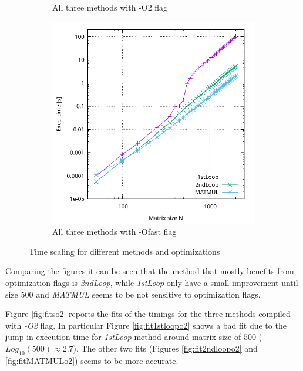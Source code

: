 \documentclass[11pt,a4paper]{article}
\begin{document}
\begin{figure}
\begin{subfigure}{0.47\textwidth}
		\caption{All three methods with -O2 flag}
		\label{fig:methodsO2}
	\end{subfigure}
	\begin{subfigure}{0.47\textwidth}
		\includegraphics[width=1\linewidth]{Data/MethodsOfast}
		\caption{All three methods with -Ofast flag}
		\label{fig:methodsOfast}
	\end{subfigure}
	\caption{Time scaling for different methods and optimizations}
	\label{fig:methods}
\end{figure}
Comparing the figures it can be seen that the method that mostly benefits from optimization flags is \textit{2ndLoop}, while \textit{1stLoop} only have a small improvement until size $500$ and \textit{MATMUL} seems to be not sensitive to optimization flags.

Figure \ref{fig:fitso2} reports the fits of the timings for the three methods compiled with \textit{-O2} flag. In particular Figure \ref{fig:fit1stloopo2} shows a bad fit due to the jump in execution time for \textit{1stLoop} method around matrix size of $500$ ($Log_{10}(500) \approx 2.7$). The other two fits (Figures \ref{fig:fit2ndloopo2} and \ref{fig:fitMATMULo2}) seems to be more accurate.
\end{document}
